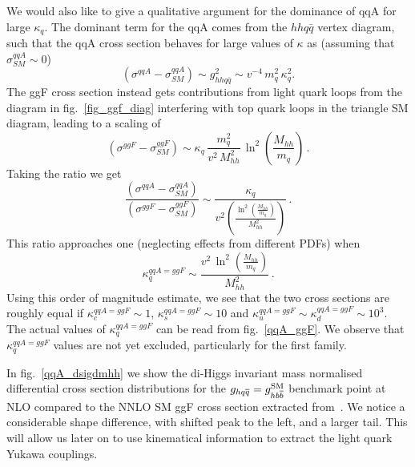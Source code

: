 We would also like to give a qualitative argument for the dominance of qqA for large $\kappa_q$.
The dominant term for the qqA comes from the $hh q \bar q$ vertex diagram, such that the qqA cross section behaves for large values of $\kappa$ as (assuming that $ \sigma^{qqA}_{SM}\sim 0 $)
\begin{equation}
	(\sigma^{qqA}-\sigma^{qqA}_{SM}) \sim  g_{hh q \bar q}^2 \sim v^{-4}\,{m_q^2\,\kappa_q^2}.
\end{equation}
The ggF cross section instead gets contributions from light quark loops from  the diagram in fig.~\ref{fig_ggf_diag} interfering with top quark loops in the triangle SM diagram,  leading to a scaling of
\begin{equation}
	(\sigma^{ggF} - \sigma^{ggF}_{SM} ) \sim  \kappa_q\, \frac{m_q^2}{ v^2\,M_{hh}^2}\,\ln^2{\left(\frac{M_{hh}}{m_q}\right)}\,.
\end{equation}
Taking the ratio we get
\begin{equation}
	\frac{(\sigma^{qqA}-\sigma^{qqA}_{SM})}{(\sigma^{ggF} - \sigma^{ggF}_{SM} )} \sim  \frac{\kappa_q}{ v^2\left(\frac{
			\ln^2{\left(\frac{M_{hh}}{m_q}\right)}}{M_{hh}^2}\right)}\,.
\end{equation}
This ratio approaches one (neglecting effects from different PDFs) when
\begin{equation}
	\kappa_q^{qqA = ggF} \sim  \frac{v^2\,\ln^2{\left(\frac{M_{hh}}{m_q}\right)}}{M_{hh}^2}\,.
\end{equation}
Using this order of magnitude estimate, we see that  the two cross sections are roughly equal if $\kappa_c^{qqA = ggF} \sim 1$, $\kappa_s^{qqA = ggF} \sim 10$ and $\kappa_u^{qqA = ggF} \sim \kappa_d^{qqA = ggF} \sim 10^3$.
The actual values of $\kappa_q^{qqA = ggF}$ can be read from fig.~\ref{qqA_ggF}. We observe that $ \kappa_q^{qqA = ggF}$ values  are not yet excluded, particularly for the first family.
\par
In fig.~\ref{qqA_dsigdmhh} we show the di-Higgs invariant mass  normalised differential cross section distributions for the $g_{hq \overline q} = g_{h b \overline b}^{\mathrm{SM}}$ benchmark point at NLO compared to the NNLO SM ggF cross section extracted from~\cite{Grazzini:2018bsd}. We notice a considerable shape difference, with shifted peak to the left, and a larger tail. This will allow us later on to use kinematical information to extract the light quark Yukawa couplings.
